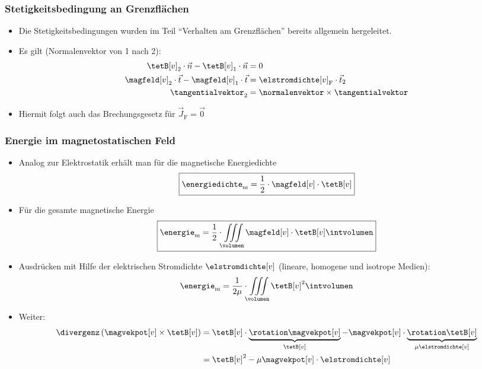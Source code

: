 \begin{frame}
  \frametitle{Stetigkeitsbedingung an Grenzflächen}
  \begin{itemize}[<+->]
  \item Die Stetigkeitsbedingungen wurden im Teil \enquote{Verhalten am Grenzflächen} bereits allgemein hergeleitet.
  \item Es gilt (Normalenvektor von 1 nach 2):
    \begin{align*}
	\tetB[v]_2\cdot \vec{n} - \tetB[v]_1\cdot\vec{n} &= 0 \\
	\magfeld[v]_2\cdot \vec{t} - \magfeld[v]_1\cdot \vec{t} & = \elstromdichte[v]_\mathrm{F}\cdot \vec{t}_2\\
	\tangentialvektor_2 & = \normalenvektor \times \tangentialvektor
\end{align*}
\item Hiermit folgt auch das \alert{Brechungsgesetz für $\vec{J}_{\text{F}} = \vec{0}$}

  \resizebox{.35\linewidth}{!}{} 
  
  \end{itemize}
\end{frame}

\begin{frame}
  \frametitle{Energie im magnetostatischen Feld}
  \begin{itemize}[<+->]
    \item Analog zur Elektrostatik erhält man für die \alert{magnetische Energiedichte}
\begin{equation*}
	\boxed{\energiedichte_\mathrm{m} = \dfrac{1}{2} \cdot \magfeld[v] \cdot \tetB[v]}
\end{equation*}
\item Für die gesamte \alert{magnetische Energie}
\begin{equation*}
	\boxed{\energie_\mathrm{m} = \dfrac{1}{2} \cdot \iiint\limits_{\volumen} \magfeld[v] \cdot \tetB[v] \intvolumen} 
\end{equation*}
\item Ausdrücken mit Hilfe der elektrischen Stromdichte \(\elstromdichte[v] \) (lineare, homogene und isotrope Medien): 
\begin{equation*}
	\energie_\mathrm{m} = \dfrac{1}{2 \mu} \cdot \iiint\limits_{\volumen} \tetB[v]^2 \intvolumen
\end{equation*}
\item Weiter:
\begin{align*}
	\divergenz \left( \magvekpot[v] \times \tetB[v] \right) &= \tetB[v] \cdot \underbrace{\rotation \magvekpot[v]}_{\tetB[v]} - \magvekpot[v] \cdot \underbrace{\rotation \tetB[v]}_{\mu \elstromdichte[v]} \\
		&= \tetB[v]^2 - \mu  \magvekpot[v] \cdot \elstromdichte[v]
\end{align*}
  \end{itemize}
\end{frame}

